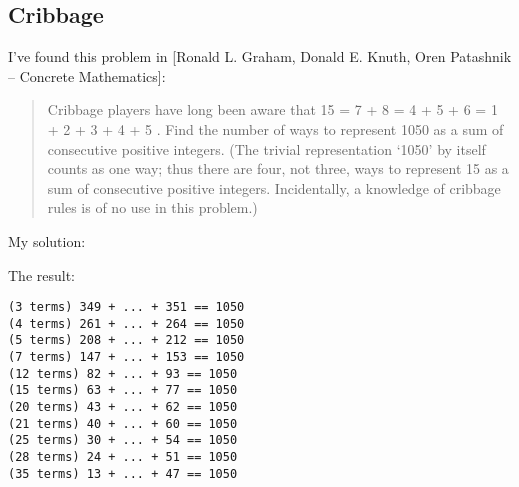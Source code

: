 \subsection{Cribbage}

I've found this problem in [Ronald L. Graham, Donald E. Knuth, Oren Patashnik -- Concrete Mathematics]:

\begin{framed}
\begin{quotation}
Cribbage players have long been aware that 15 = 7 + 8 = 4 + 5 + 6 =
1 + 2 + 3 + 4 + 5 . Find the number of ways to represent 1050 as a sum of
consecutive positive integers. (The trivial representation `1050' by itself
counts as one way; thus there are four, not three, ways to represent 15
as a sum of consecutive positive integers. Incidentally, a knowledge of
cribbage rules is of no use in this problem.)
\end{quotation}
\end{framed}

My solution:



The result:

\begin{lstlisting}
(3 terms) 349 + ... + 351 == 1050
(4 terms) 261 + ... + 264 == 1050
(5 terms) 208 + ... + 212 == 1050
(7 terms) 147 + ... + 153 == 1050
(12 terms) 82 + ... + 93 == 1050
(15 terms) 63 + ... + 77 == 1050
(20 terms) 43 + ... + 62 == 1050
(21 terms) 40 + ... + 60 == 1050
(25 terms) 30 + ... + 54 == 1050
(28 terms) 24 + ... + 51 == 1050
(35 terms) 13 + ... + 47 == 1050
\end{lstlisting}

